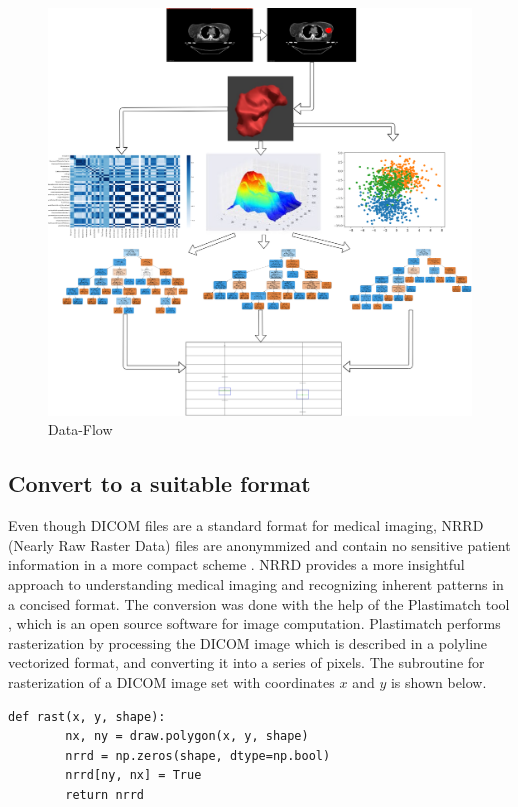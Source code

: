 \documentclass[final,1p,times,twocolumn]{elsarticle}
\begin{document}
\begin{figure}[!b]
\centering
\includegraphics[width=5.4in]{im.png}
\caption{Data-Flow}
\label{img2}
\end{figure}

\subsection{Convert to a suitable format}

Even though DICOM files are a standard format for medical imaging, NRRD (Nearly Raw Raster Data) files are anonymmized and contain no sensitive patient information in a more compact scheme \cite{12}. NRRD provides a more insightful approach to understanding medical imaging and recognizing inherent patterns in a concised format. The conversion was done with the help of the Plastimatch tool \cite{13}, which is an open source software for image computation. Plastimatch performs rasterization by processing the DICOM image which is described in a polyline vectorized format, and converting it into a series of pixels. The subroutine for rasterization of a DICOM image set with coordinates $x$ and $y$ is shown below.

{\scriptsize
\begin{verbatim}
def rast(x, y, shape):
        nx, ny = draw.polygon(x, y, shape)
        nrrd = np.zeros(shape, dtype=np.bool)
        nrrd[ny, nx] = True 
        return nrrd
\end{verbatim}}
\end{document}
